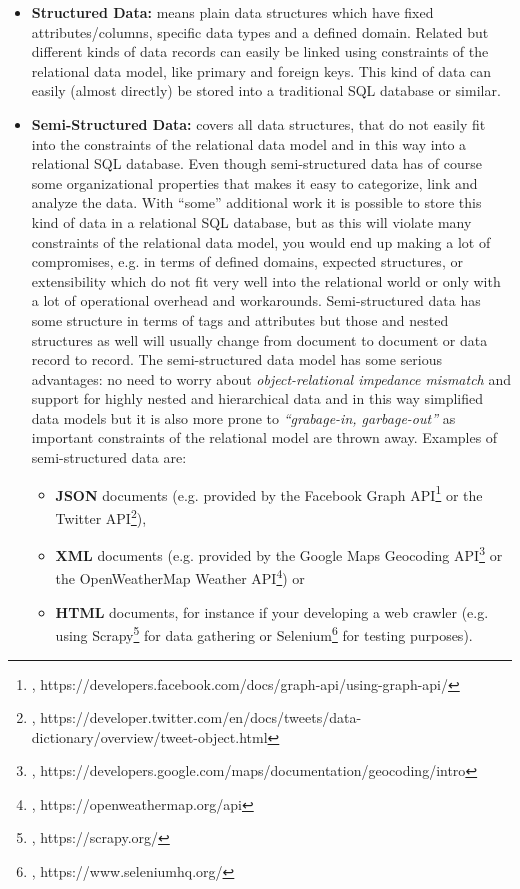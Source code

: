 \begin{itemize}
	\item \textbf{Structured Data:} means plain data structures which have fixed attributes/columns, specific data types and a defined domain. Related but different kinds of data records can easily be linked using constraints of the relational data model, like primary and foreign keys. This kind of data can easily (almost directly) be stored into a traditional SQL database or similar.\\
	\item \textbf{Semi-Structured Data:} covers all data structures, that do not easily fit into the constraints of the relational data model and in this way into a relational SQL database. Even though semi-structured data has of course some organizational properties that makes it easy to categorize, link and analyze the data. With ``some'' additional work it is possible to store this kind of data in a relational SQL database, but as this will violate many constraints of the relational data model, you would end up making a lot of compromises, e.g. in terms of defined domains, expected structures, or extensibility which do not fit very well into the relational world or only with a lot of operational overhead and workarounds. Semi-structured data has some structure in terms of tags and attributes but those and nested structures as well will usually change from document to document or data record to record. The semi-structured data model has some serious advantages: no need to worry about \textit{object-relational impedance mismatch} and support for highly nested and hierarchical data and in this way simplified data models but it is also more prone to \textit{``grabage-in, garbage-out''} as important constraints of the relational model are thrown away. Examples of semi-structured data are:
	\begin{itemize}
		\item \textbf{JSON} documents (e.g. provided by the Facebook Graph API\footnote{\cite{FBGAPI}, https://developers.facebook.com/docs/graph-api/using-graph-api/} or the Twitter API\footnote{\cite{TWTAPI}, https://developer.twitter.com/en/docs/tweets/data-dictionary/overview/tweet-object.html}), 
		\item \textbf{XML} documents (e.g. provided by the Google Maps Geocoding API\footnote{\cite{GMGCAPI}, https://developers.google.com/maps/documentation/geocoding/intro} or the OpenWeatherMap Weather API\footnote{\cite{OWMAPI}, https://openweathermap.org/api}) or
		\item \textbf{HTML} documents, for instance if your developing a web crawler (e.g. using Scrapy\footnote{\cite{SCPYHP}, https://scrapy.org/} for data gathering or Selenium\footnote{\cite{SELEHP}, https://www.seleniumhq.org/} for testing purposes).\\

\end{itemize}
\end{itemize}
